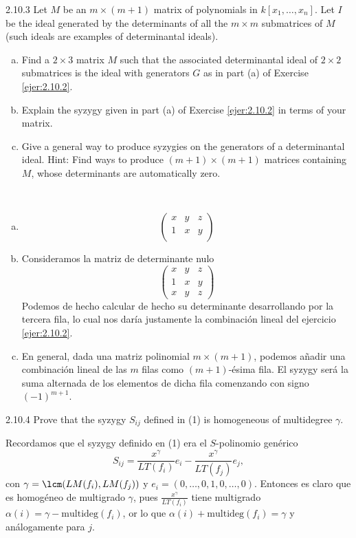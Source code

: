 \documentclass[twoside]{article}
\begin{document}
\begin{ejercicio}{2.10.3}
Let $M$ be an $m × (m + 1)$ matrix of polynomials in $k[x_1, \dots , x_n]$. Let $I$ be the ideal generated
by the determinants of all the $m × m$ submatrices of $M$ (such ideals are examples
of determinantal ideals).
\begin{enumerate}[a.]
\item Find a $2×3$ matrix $M$ such that the associated determinantal ideal of $2×2$ submatrices
is the ideal with generators $G$ as in part (a) of Exercise \ref{ejer:2.10.2}.
\item Explain the syzygy given in part (a) of Exercise \ref{ejer:2.10.2} in terms of your matrix.
\item Give a general way to produce syzygies on the generators of a determinantal ideal.
Hint: Find ways to produce $(m + 1) × (m + 1)$ matrices containing $M$, whose determinants
are automatically zero.
\end{enumerate}
\end{ejercicio}
\begin{solucion}\
\begin{enumerate}[a.]
\item 
\[
\begin{pmatrix}
 x& y & z\\
 1& x & y \\
\end{pmatrix}
\]

\item Consideramos la matriz de determinante nulo
\[
\begin{pmatrix}
 x& y & z\\
 1& x & y \\
 x &y & z
\end{pmatrix}
\]
Podemos de hecho calcular de hecho su determinante desarrollando por la tercera fila, lo cual nos daría justamente la combinación lineal del ejercicio \ref{ejer:2.10.2}.

\item En general, dada una matriz polinomial $m\times (m+1)$, podemos añadir una combinación lineal de las $m$ filas como $(m+1)$-ésima fila. El syzygy será la suma alternada de los elementos de dicha fila comenzando con signo $(-1)^{m+1}$.
\end{enumerate}
\end{solucion}

\newpage

\begin{ejercicio}{2.10.4}
Prove that the syzygy $S_{ij}$ defined in (1) is homogeneous of multidegree $γ$.
\end{ejercicio}
\begin{solucion}
Recordamos que el syzygy definido en (1) era el $S$-polinomio genérico
\[
S_{ij}=\frac{x^\gamma}{LT(f_i)}e_i-\frac{x^\gamma}{LT(f_j)}e_j,
\]
con $\gamma=\lcm(LM(f_i),LM(f_j))$ y $e_i=(0,\dots,0,1,0,\dots, 0)$. Entonces es claro que es homogéneo de multigrado $\gamma$, pues $\frac{x^\gamma}{LT(f_i)}$ tiene multigrado $\alpha(i)=\gamma-\mathrm{multideg}(f_i)$, or lo que $\alpha(i)+\mathrm{multideg}(f_i)=\gamma$ y análogamente para $j$.
\end{solucion}
\newpage
\end{document}
